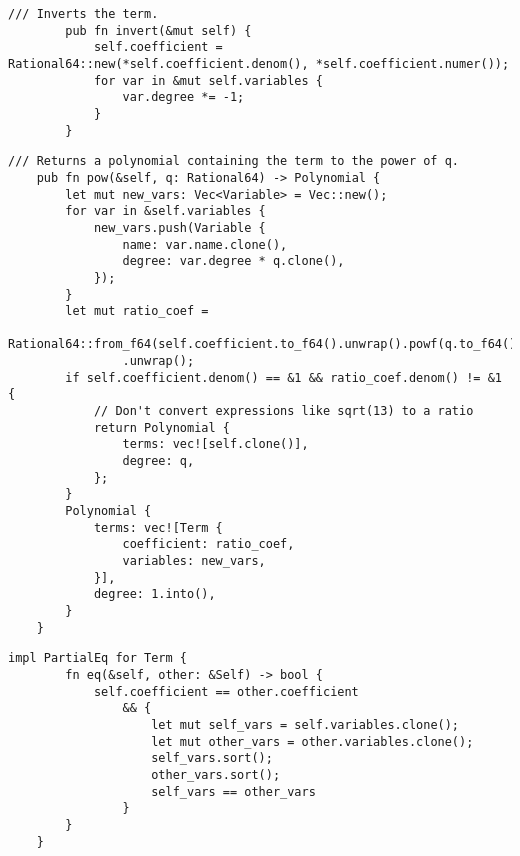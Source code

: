 \begin{minipage}{\linewidth}
    \begin{lstlisting}[caption={The implementation of the \texttt{invert()} method for the \texttt{Term} struct}, label={lst:term-invert}]
        /// Inverts the term.
        pub fn invert(&mut self) {
            self.coefficient = Rational64::new(*self.coefficient.denom(), *self.coefficient.numer());
            for var in &mut self.variables {
                var.degree *= -1;
            }
        }
    \end{lstlisting}
\end{minipage}

\begin{lstlisting}[caption={The implementation of the \texttt{pow()} method for the \texttt{Term} struct}, label={lst:term-pow}]
    /// Returns a polynomial containing the term to the power of q.
    pub fn pow(&self, q: Rational64) -> Polynomial {
        let mut new_vars: Vec<Variable> = Vec::new();
        for var in &self.variables {
            new_vars.push(Variable {
                name: var.name.clone(),
                degree: var.degree * q.clone(),
            });
        }
        let mut ratio_coef =
            Rational64::from_f64(self.coefficient.to_f64().unwrap().powf(q.to_f64().unwrap()))
                .unwrap();
        if self.coefficient.denom() == &1 && ratio_coef.denom() != &1 {
            // Don't convert expressions like sqrt(13) to a ratio
            return Polynomial {
                terms: vec![self.clone()],
                degree: q,
            };
        }
        Polynomial {
            terms: vec![Term {
                coefficient: ratio_coef,
                variables: new_vars,
            }],
            degree: 1.into(),
        }
    }
\end{lstlisting}

\begin{lstlisting}[caption={The implementation of \texttt{PartialEq} for the \texttt{Term} struct}, label={lst:term-eq}]
    impl PartialEq for Term {
        fn eq(&self, other: &Self) -> bool {
            self.coefficient == other.coefficient
                && {
                    let mut self_vars = self.variables.clone();
                    let mut other_vars = other.variables.clone();
                    self_vars.sort();
                    other_vars.sort();
                    self_vars == other_vars
                }
        }
    }
\end{lstlisting}

